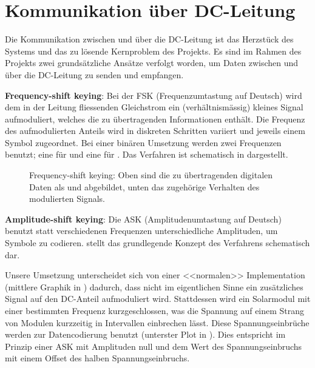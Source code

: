 \clearpage
\section{Kommunikation \"uber DC-Leitung}
\label{sec:commDCLine}

Die Kommunikation zwischen  \Sensor und \Master \"uber die  DC-Leitung ist das
Herzst\"uck des Systems und das zu l\"osende Kernproblem des Projekts. Es sind
im Rahmen  des Projekts  zwei grunds\"atzliche  Ans\"atze verfolgt  worden, um
Daten  zwischen  \Sensor und  \Master  \"uber  die  DC-Leitung zu  senden  und
empfangen.

\textbf{Frequency-shift keying}: Bei  der FSK (Frequenzumtastung  auf Deutsch)
wird  dem in  der Leitung  fliessenden Gleichstrom  ein (verh\"altnism\"assig)
kleines  Signal aufmoduliert,  welches  die  zu \"ubertragenden  Informationen
enth\"alt. Die  Frequenz   des  aufmodulierten   Anteils  wird   in  diskreten
Schritten variiert  und jeweils  einem Symbol zugeordnet. Bei  einer bin\"aren
Umsetzung  werden  zwei  Frequenzen  benutzt; eine  f\"ur    und  eine
f\"ur  .   Das  Verfahren ist  schematisch  in  
dargestellt.

\begin{figure}[h!tb]
    \centering
    
    \caption[Frequency-Shift keying]{%
        Frequency-shift  keying: Oben sind  die  zu \"ubertragenden  digitalen
        Daten  als   und   abgebildet, unten  das zugeh\"orige
        Verhalten des modulierten Signals.%
    }
    \label{fig:fsk:concept}
\end{figure}


\textbf{Amplitude-shift  keying}: Die  ASK (Amplitudenumtastung  auf  Deutsch)
benutzt statt verschiedenen Frequenzen unterschiedliche Amplituden, um Symbole
zu  codieren.    stellt  das  grundlegende  Konzept  des
Verfahrens schematisch dar.

Unsere  Umsetzung unterscheidet  sich  von  einer <<normalen>>  Implementation
(mittlere   Graphik  in   )  dadurch,   dass  nicht   im
eigentlichen Sinne  ein zus\"atzliches  Signal auf den  DC-Anteil aufmoduliert
wird. Stattdessen   wird  ein   Solarmodul  mit   einer  bestimmten   Frequenz
kurzgeschlossen,  was die  Spannung auf  einem Strang  von Modulen  kurzzeitig
in  Intervallen  einbrechen  l\"asst. Diese  Spannungseinbr\"uche  werden  zur
Datencodierung  benutzt   (unterster  Plot   in  ). Dies
entspricht  im  Prinzip  einer  ASK  mit Amplituden  null  und  dem  Wert  des
Spannungseinbruchs mit einem Offset des halben Spannungseinbruchs.

